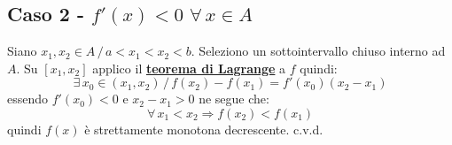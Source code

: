 \documentclass[../dimostrazioni]{subfiles}
\begin{document}
            \subsection*{Caso 2 - \( f'(x) < 0 \, \, \forall \, x \in A \)}

            Siano \(x_1, x_2 \in A \, / \, a < x_1 < x_2 < b \). Seleziono un sottointervallo chiuso interno ad \(A\).
            Su \( [x_1, x_2] \) applico il \textbf{\hyperref[teoLagrange]{teorema di Lagrange}} a \(f\) quindi:
            \[
                \exists \, x_0 \in (x_1, x_2) \, / \, f(x_2) - f(x_1) = f'(x_0)(x_2 - x_1) 
            \]
            essendo \( f'(x_0) < 0 \) e \( x_2 - x_1 > 0 \) ne segue che:
            \[
                \forall \, x_1 < x_2 \Rightarrow f(x_2) < f(x_1)
            \]
            quindi \(f(x)\) è strettamente monotona decrescente. c.v.d.
    
    
\end{document}
